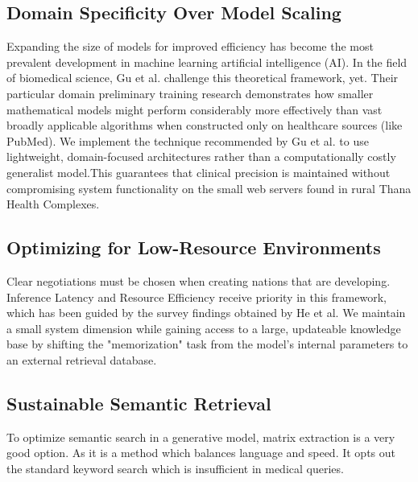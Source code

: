 \subsection{Domain Specificity Over Model Scaling
}
Expanding the size of models for improved efficiency has become the most prevalent development in machine learning artificial intelligence (AI). In the field of biomedical science, Gu et al. \cite{Gu2021} challenge this theoretical framework, yet. Their particular domain preliminary training research demonstrates how smaller mathematical models might perform considerably more effectively than vast broadly applicable algorithms when constructed only on healthcare sources (like PubMed). We implement the technique recommended by Gu et al. \cite{Gu2021} to use lightweight, domain-focused architectures rather than a computationally costly generalist model.This guarantees that clinical precision is maintained without compromising system functionality on the small web servers found in rural Thana Health Complexes.

\subsection{Optimizing for Low-Resource Environments}
Clear negotiations must be chosen when creating nations that are developing. Inference Latency and Resource Efficiency receive priority in this framework, which has been guided by the survey findings obtained by He et al.\cite{He2025}  We maintain a small system dimension while gaining access to a large, updateable knowledge base by shifting the "memorization" task from the model's internal parameters to an external retrieval database.
\subsection{Sustainable Semantic Retrieval}
To optimize semantic search in a generative model, matrix extraction is a very good option. As it is a method which balances language and speed.\cite{Kim2025} It opts out the standard keyword search which is insufficient in medical queries.

